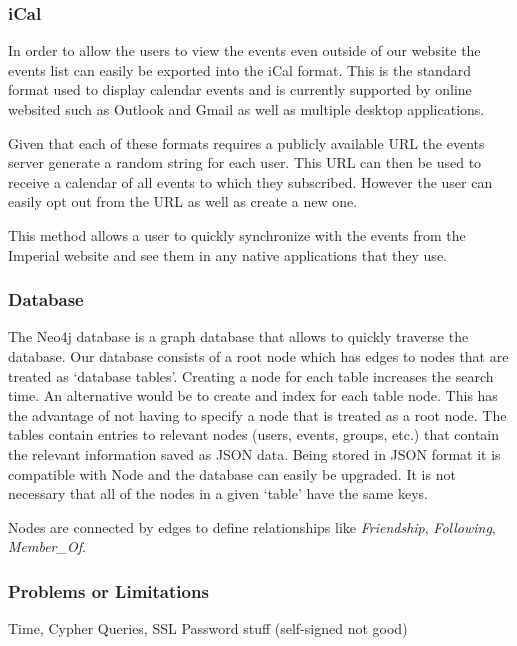 \documentclass[11pt]{article}
\begin{document}
\subsubsection{iCal}

In order to allow the users to view the events even outside of our website the events list can easily be exported into the iCal format. This is the standard format used to display calendar events and is currently supported by online websited such as Outlook and Gmail as well as multiple desktop applications.

Given that each of these formats requires a publicly available URL the events server generate a random string for each user. This URL can then be used to receive a calendar of all events to which they subscribed. However the user can easily opt out from the URL as well as create a new one.

This method allows a user to quickly synchronize with the events from the Imperial website and see them in any native applications that they use.

\subsubsection{Database}

The Neo4j database is a graph database that allows to quickly traverse the database.
Our database consists of a root node which has edges to nodes that are treated as `database tables'.
Creating a node for each table increases the search time. An alternative would be to create and index for each table node. This has the advantage of not having to specify a node that is treated as a root node.
The tables contain entries to relevant nodes (users, events, groups, etc.) that contain the relevant information saved as JSON data. Being stored in JSON format it is compatible with Node and the database can easily be upgraded. It is not necessary that all of the nodes in a given `table' have the same keys.

Nodes are connected by edges to define relationships like \textit{Friendship}, \textit{Following}, \textit{Member\_Of}.

\subsubsection{Problems or Limitations}
	
	Time, Cypher Queries, SSL Password stuff (self-signed not good)
\end{document}
